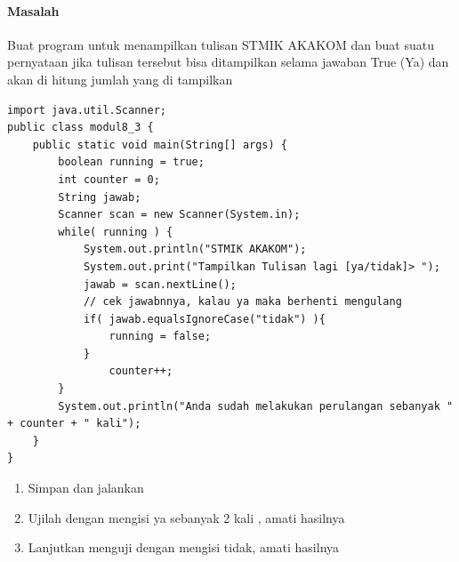 \documentclass[a4paper,12pt]{article}
\begin{document}
\paragraph{Masalah\\}
Buat program untuk menampilkan tulisan STMIK AKAKOM dan buat suatu
pernyataan jika tulisan tersebut bisa ditampilkan selama jawaban True (Ya) dan akan
di hitung jumlah yang di tampilkan
\begin{lstlisting}[frame=single, basicstyle=\small]
import java.util.Scanner;
public class modul8_3 {
    public static void main(String[] args) {
        boolean running = true;
        int counter = 0;
        String jawab;
        Scanner scan = new Scanner(System.in);
        while( running ) {
            System.out.println("STMIK AKAKOM");
            System.out.print("Tampilkan Tulisan lagi [ya/tidak]> ");
            jawab = scan.nextLine();
            // cek jawabnnya, kalau ya maka berhenti mengulang
            if( jawab.equalsIgnoreCase("tidak") ){
                running = false;
            }
                counter++;
        }
        System.out.println("Anda sudah melakukan perulangan sebanyak " + counter + " kali");
    }
}
\end{lstlisting}
\begin{enumerate}[label=\alph*.]
	\item Simpan dan jalankan
	\item Ujilah dengan mengisi ya sebanyak 2 kali , amati hasilnya
	\item Lanjutkan menguji dengan mengisi tidak, amati hasilnya
\end{enumerate}
\end{document}
